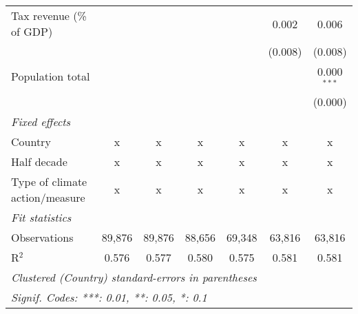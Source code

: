 \begin{tabular}{lcccccc}
   Tax revenue (\% of GDP)              &         &               &                &               & 0.002         & 0.006\\   
                                        &         &               &                &               & (0.008)       & (0.008)\\   
   Population total                     &         &               &                &               &               & 0.000$^{***}$\\   
                                        &         &               &                &               &               & (0.000)\\   
   \emph{Fixed effects}\\
   Country                              & x       & x             & x              & x             & x             & x\\  
   Half decade                          & x       & x             & x              & x             & x             & x\\  
   Type of climate action/measure       & x       & x             & x              & x             & x             & x\\  
   \midrule \emph{Fit statistics}\\
   Observations                         & 89,876  & 89,876        & 88,656         & 69,348        & 63,816        & 63,816\\  
   R$^2$                                & 0.576   & 0.577         & 0.580          & 0.575         & 0.581         & 0.581\\  
   \midrule
   \multicolumn{7}{l}{\emph{Clustered (Country) standard-errors in parentheses}}\\
   \multicolumn{7}{l}{\emph{Signif. Codes: ***: 0.01, **: 0.05, *: 0.1}}\\
\end{tabular}
\par\endgroup


